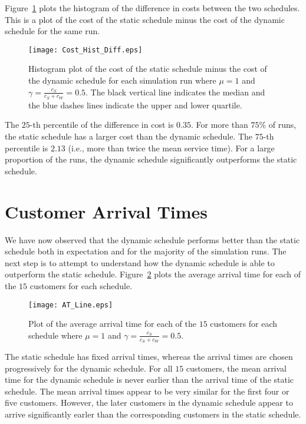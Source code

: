 Figure~\ref{fig:Diff_Cost} plots the histogram of the difference in costs between the two schedules. This is a plot of the cost of the static schedule minus the cost of the dynamic schedule for the same run.
\begin{figure}[htb]
	\centering
	\texttt{[image: Cost\_Hist\_Diff.eps]}
	\caption{Histogram plot of the cost of the static schedule minus the cost of the dynamic schedule for each simulation run where $\mu = 1$ and $\gamma = \frac{c_{S}}{c_{S} + c_{W}} = 0.5$. The black vertical line indicates the median and the blue dashes lines indicate the upper and lower quartile.}
	\label{fig:Diff_Cost}
\end{figure}

The $25$-th percentile of the difference in cost is $0.35$. For more than $75 \%$ of runs, the static schedule has a larger cost than the dynamic schedule. The $75$-th percentile is $2.13$ (i.e., more than twice the mean service time). For a large proportion of the runs, the dynamic schedule significantly outperforms the static schedule.

\section{Customer Arrival Times}
We have now observed that the dynamic schedule performs better than the static schedule both in expectation and for the majority of the simulation runs. The next step is to attempt to understand how the dynamic schedule is able to outperform the static schedule. Figure~\ref{fig:Avg_Arrival} plots the average arrival time for each of the $15$ customers for each schedule.
\begin{figure}[htb]
	\centering
	\texttt{[image: AT\_Line.eps]}
	\caption{Plot of the average arrival time for each of the $15$ customers for each schedule where $\mu = 1$ and $\gamma = \frac{c_{S}}{c_{S} + c_{W}} = 0.5$.}
	\label{fig:Avg_Arrival}
\end{figure}

The static schedule has fixed arrival times, whereas the arrival times are chosen progressively for the dynamic schedule. For all $15$ customers, the mean arrival time for the dynamic schedule is never earlier than the arrival time of the static schedule. The mean arrival times appear to be very similar for the first four or five customers. However, the later customers in the dynamic schedule appear to arrive significantly earler than the corresponding customers in the static schedule.

